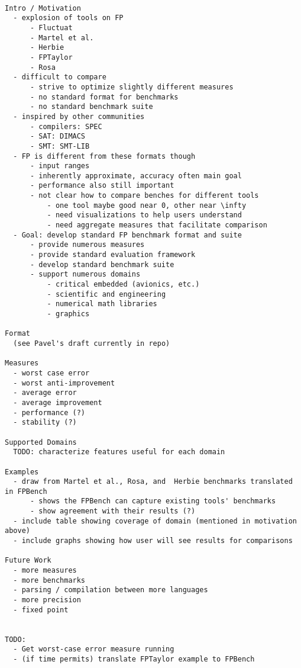\begin{verbatim}

Intro / Motivation
  - explosion of tools on FP
      - Fluctuat
      - Martel et al.
      - Herbie
      - FPTaylor
      - Rosa
  - difficult to compare
      - strive to optimize slightly different measures
      - no standard format for benchmarks
      - no standard benchmark suite
  - inspired by other communities
      - compilers: SPEC
      - SAT: DIMACS
      - SMT: SMT-LIB
  - FP is different from these formats though
      - input ranges
      - inherently approximate, accuracy often main goal
      - performance also still important
      - not clear how to compare benches for different tools
          - one tool maybe good near 0, other near \infty
          - need visualizations to help users understand
          - need aggregate measures that facilitate comparison
  - Goal: develop standard FP benchmark format and suite
      - provide numerous measures
      - provide standard evaluation framework
      - develop standard benchmark suite
      - support numerous domains
          - critical embedded (avionics, etc.)
          - scientific and engineering
          - numerical math libraries
          - graphics

Format
  (see Pavel's draft currently in repo)

Measures
  - worst case error
  - worst anti-improvement
  - average error
  - average improvement
  - performance (?)
  - stability (?)

Supported Domains
  TODO: characterize features useful for each domain

Examples
  - draw from Martel et al., Rosa, and  Herbie benchmarks translated in FPBench
      - shows the FPBench can capture existing tools' benchmarks
      - show agreement with their results (?)
  - include table showing coverage of domain (mentioned in motivation above)
  - include graphs showing how user will see results for comparisons

Future Work
  - more measures
  - more benchmarks
  - parsing / compilation between more languages
  - more precision
  - fixed point


TODO:
  - Get worst-case error measure running
  - (if time permits) translate FPTaylor example to FPBench

\end{verbatim}
